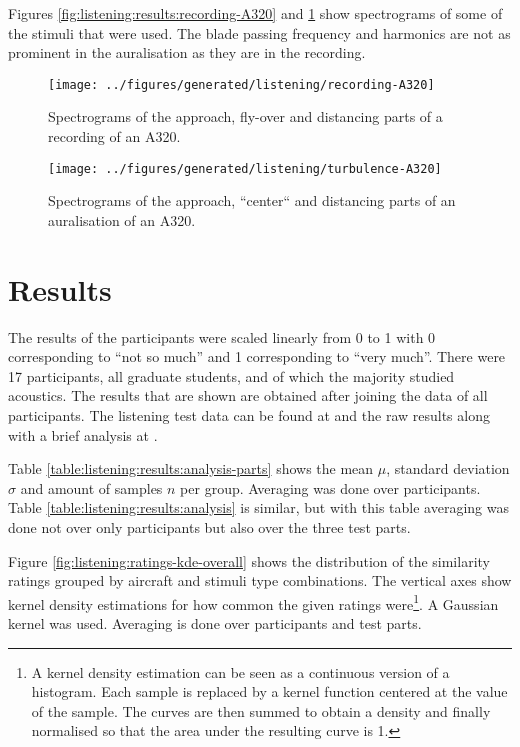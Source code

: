 Figures \ref{fig:listening:results:recording-A320} and
\ref{fig:listening:results:simulation-A320} show spectrograms of some of the stimuli
that were used. The blade passing frequency and harmonics are not as prominent
in the auralisation as they are in the recording.

\begin{figure}[H]
  \centering
  \texttt{[image: ../figures/generated/listening/recording-A320]}
  \caption{Spectrograms of the approach, fly-over and distancing parts of a recording of an A320.}
  \label{fig:listening:results:recording-A320}
%
  \centering
  \texttt{[image: ../figures/generated/listening/turbulence-A320]}
  \caption{Spectrograms of the approach, ``center`` and distancing parts of an auralisation of an A320.}
  \label{fig:listening:results:simulation-A320}
\end{figure}

\newpage
\section{Results}
The results of the participants were scaled linearly from 0 to 1 with 0
corresponding to ``not so much'' and 1 corresponding to ``very much''.
There were 17 participants, all graduate students, and of which the majority
studied acoustics. The results that are shown are obtained after joining the
data of all participants. %
The listening test data can be found at \cite{Rietdijk2017a} and the
raw results along with a brief analysis at \cite{Rietdijk2017b}.

Table \ref{table:listening:results:analysis-parts} shows the mean $\mu$,
standard deviation $\sigma$ and amount of samples $n$ per group.
Averaging was done over participants. Table \ref{table:listening:results:analysis} is similar,
but with this table averaging was done not over only participants but also over the three test parts.

Figure \ref{fig:listening:ratings-kde-overall} shows the distribution of the similarity ratings grouped by aircraft and stimuli type combinations.
The vertical axes show kernel density estimations for how common the given ratings were\footnote{
A kernel density estimation can be seen as a continuous version of a histogram. Each sample is replaced by a kernel function centered at the value of the sample.
The curves are then summed to obtain a density and finally normalised so that the area under the resulting curve is 1.
}. A Gaussian kernel was used. Averaging is done over participants and test parts.

